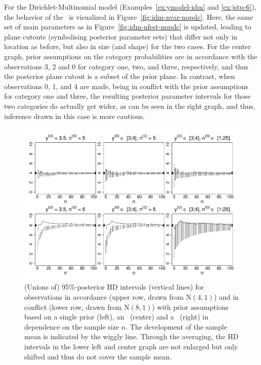 \begin{example}
\label{ex:jstp-8}
For the Dirichlet-Multinomial model (Examples~\ref{ex:ymodel-idm} and \ref{ex:jstp-6}),
the behavior of the \nymodel\ is visualized in Figure~\ref{fig:idm-nvar-nopdc}. Here, the same set
of main parameters as in Figure~\ref{fig:idm-nfest-nopdc} is updated, leading
to plane cutouts (symbolising posterior parameter sets) that
differ not only in location as before, but also in size (and shape) for the
two cases. For the center graph, prior assumptions on the category
probabilities are in accordance with the observations 3, 2 and 0
for category one, two, and three, respectively, and thus the
posterior plane cutout is a subset of the prior plane. In
contrast, when observations 0, 1, and 4 are made, being in
conflict with the prior assumptions for category one and three,
the resulting posterior parameter intervals for those two
categories do actually get wider, as can be seen in the right
graph, and thus, inference drawn in this case is more cautious.
\end{example}

\begin{figure} %
\includegraphics[trim = 5mm 5mm 5mm 5mm, clip, width=\textwidth]{fig/jstp-paper_nv_nvar_HPD_n-infty_081201}%
\caption[Comparison of (unions of) HPD intervals based on a single prior,
an \ymodel\ and a \nymodel.]%
{(Unions of) 95\%-posterior HD intervals (vertical lines) for
observations in accordance (upper row, drawn from $\mbox{N}(4,1)$)
and in conflict (lower row, drawn from $\mbox{N}(8,1)$) with prior assumptions
based on a single prior (left), an \ymodel\ (center) and a \nymodel\ (right)
in dependence on the sample size $n$. The development of the sample mean is
indicated by the wiggly line. Through the averaging, the HD intervals in the
lower left and center graph are not enlarged but only shifted and thus do not cover the sample mean.}
\label{fig:nv-nvar-kinfty}
\end{figure}


